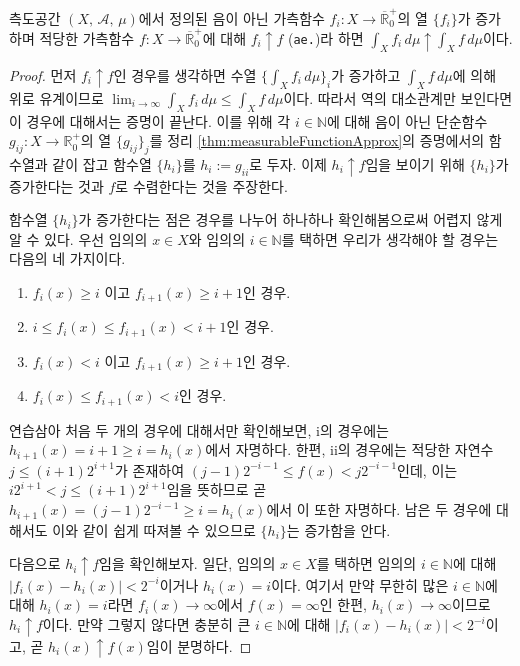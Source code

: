 \begin{theorem}
    측도공간 $(X,\,\mathcal{A},\,\mu)$에서 정의된 음이 아닌 가측함수 $f_i:X\to\overline{\mathbb{R}}^+_0$의 열 $\{f_i\}$가 증가하며 적당한 가측함수 $f:X\to\overline{\mathbb{R}}^+_0$에 대해 $f_i\uparrow f$ (\texttt{ae.})라 하면 $\int_Xf_i\,d\mu\uparrow\int_Xf\,d\mu$이다.
\end{theorem}

\begin{proof}
    먼저 $f_i\uparrow f$인 경우를 생각하면 수열 $\{\int_Xf_i\,d\mu\}_i$가 증가하고 $\int_Xf\,d\mu$에 의해 위로 유계이므로 $\lim_{i\to\infty}\int_Xf_i\,d\mu\leq\int_Xf\,d\mu$이다. 따라서 역의 대소관계만 보인다면 이 경우에 대해서는 증명이 끝난다. 이를 위해 각 $i\in\mathbb{N}$에 대해 음이 아닌 단순함수 $g_{ij}:X\to\mathbb{R}^+_0$의 열 $\{g_{ij}\}_j$를 정리 \ref{thm:measurableFunctionApprox}의 증명에서의 함수열과 같이 잡고 함수열 $\{h_i\}$를 $h_i:=g_{ii}$로 두자. 이제 $h_i\uparrow f$임을 보이기 위해 $\{h_i\}$가 증가한다는 것과 $f$로 수렴한다는 것을 주장한다.

    함수열 $\{h_i\}$가 증가한다는 점은 경우를 나누어 하나하나 확인해봄으로써 어렵지 않게 알 수 있다. 우선 임의의 $x\in X$와 임의의 $i\in\mathbb{N}$를 택하면 우리가 생각해야 할 경우는 다음의 네 가지이다.
    \begin{enumerate}
        \item $f_i(x)\geq i$ 이고 $f_{i+1}(x)\geq i+1$인 경우.
        \item $i\leq f_i(x)\leq f_{i+1}(x)<i+1$인 경우.
        \item $f_i(x)<i$ 이고 $f_{i+1}(x)\geq i+1$인 경우.
        \item $f_i(x)\leq f_{i+1}(x)<i$인 경우.
    \end{enumerate}
    연습삼아 처음 두 개의 경우에 대해서만 확인해보면, i의 경우에는 $h_{i+1}(x)=i+1\geq i=h_i(x)$에서 자명하다. 한편, ii의 경우에는 적당한 자연수 $j\leq(i+1)2^{i+1}$가 존재하여 $(j-1)2^{-i-1}\leq f(x)<j2^{-i-1}$인데, 이는 $i2^{i+1}<j\leq(i+1)2^{i+1}$임을 뜻하므로 곧 $h_{i+1}(x)=(j-1)2^{-i-1}\geq i=h_i(x)$에서 이 또한 자명하다. 남은 두 경우에 대해서도 이와 같이 쉽게 따져볼 수 있으므로 $\{h_i\}$는 증가함을 안다.

    다음으로 $h_i\uparrow f$임을 확인해보자. 일단, 임의의 $x\in X$를 택하면 임의의 $i\in\mathbb{N}$에 대해 $|f_i(x)-h_i(x)|<2^{-i}$이거나 $h_i(x)=i$이다. 여기서 만약 무한히 많은 $i\in\mathbb{N}$에 대해 $h_i(x)=i$라면 $f_i(x)\to\infty$에서 $f(x)=\infty$인 한편, $h_i(x)\to\infty$이므로 $h_i\uparrow f$이다. 만약 그렇지 않다면 충분히 큰 $i\in\mathbb{N}$에 대해 $|f_i(x)-h_i(x)|<2^{-i}$이고, 곧 $h_i(x)\uparrow f(x)$임이 분명하다.


\end{proof}
